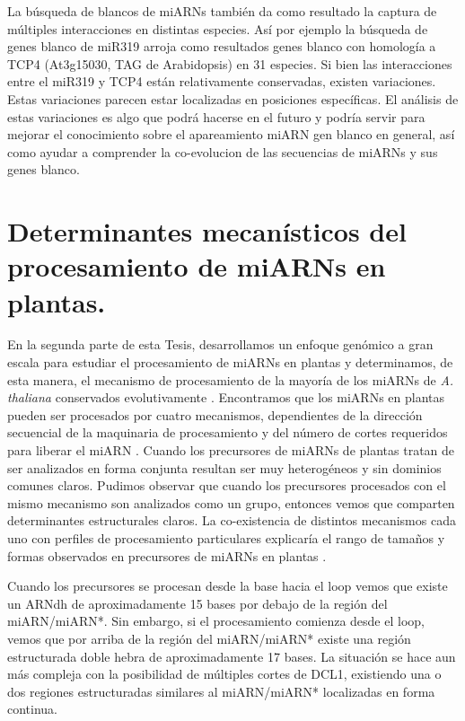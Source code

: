La búsqueda de blancos de miARNs también da como resultado la captura de múltiples interacciones en distintas especies.
Así por ejemplo la búsqueda de genes blanco de miR319 arroja como resultados genes blanco con homología a TCP4 (At3g15030, TAG de Arabidopsis) en 31 especies.
Si bien las interacciones entre el miR319 y TCP4 están relativamente conservadas, existen variaciones.
Estas variaciones parecen estar localizadas en posiciones específicas.
El análisis de estas variaciones es algo que podrá hacerse en el futuro y podría servir para mejorar el conocimiento sobre el apareamiento miARN gen blanco en general, así como ayudar a comprender la co-evolucion de las secuencias de miARNs y sus genes blanco.

\section{Determinantes mecanísticos del procesamiento de miARNs en plantas.}

En la segunda parte de esta Tesis, desarrollamos un enfoque genómico a gran escala para estudiar el procesamiento de miARNs en plantas y determinamos, de esta manera, el mecanismo de procesamiento de la mayoría de los miARNs de \textit{A. thaliana} conservados evolutivamente \citep{Bologna2013}.
Encontramos que los miARNs en plantas pueden ser procesados por cuatro mecanismos, dependientes de la dirección secuencial de la maquinaria de procesamiento y del número de cortes requeridos para liberar el miARN \citep{Bologna2013}.
Cuando los precursores de miARNs de plantas tratan de ser analizados en forma conjunta resultan ser muy heterogéneos y sin dominios comunes claros.
Pudimos observar que cuando los precursores procesados con el mismo mecanismo son analizados como un grupo, entonces vemos que comparten determinantes estructurales claros.
La co-existencia de distintos mecanismos cada uno con perfiles de procesamiento particulares explicaría el rango de tamaños y formas observados en precursores de miARNs en plantas \citep{Bologna2013}.

Cuando los precursores se procesan desde la base hacia el loop vemos que existe un ARNdh de aproximadamente 15 bases por debajo de la región del miARN/miARN*.
Sin embargo, si el procesamiento comienza desde el loop, vemos que por arriba de la región del miARN/miARN* existe una región estructurada doble hebra de aproximadamente 17 bases.
La situación se hace aun más compleja con la posibilidad de múltiples cortes de DCL1, existiendo una o dos regiones estructuradas similares al miARN/miARN* localizadas en forma continua.


